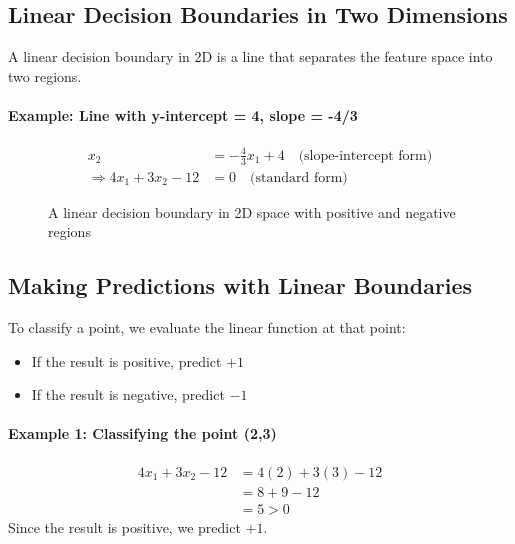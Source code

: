 \documentclass{article}
\begin{document}
\subsection{Linear Decision Boundaries in Two Dimensions}
A linear decision boundary in 2D is a line that separates the feature space into two regions.

\paragraph{Example: Line with y-intercept = 4, slope = -4/3}
\begin{align}
    x_2 &= -\frac{4}{3}x_1 + 4 \quad \text{(slope-intercept form)}\\
    \Rightarrow 4x_1 + 3x_2 - 12 &= 0 \quad \text{(standard form)}
\end{align}

\begin{figure}[h]
\centering
{}
\caption{A linear decision boundary in 2D space with positive and negative regions}
\end{figure}

\subsection{Making Predictions with Linear Boundaries}
To classify a point, we evaluate the linear function at that point:
\begin{itemize}
    \item If the result is positive, predict $+1$
    \item If the result is negative, predict $-1$
\end{itemize}

\paragraph{Example 1: Classifying the point (2,3)}
\begin{align}
    4x_1 + 3x_2 - 12 &= 4(2) + 3(3) - 12\\
    &= 8 + 9 - 12\\
    &= 5 > 0
\end{align}
Since the result is positive, we predict $+1$.
\end{document}
